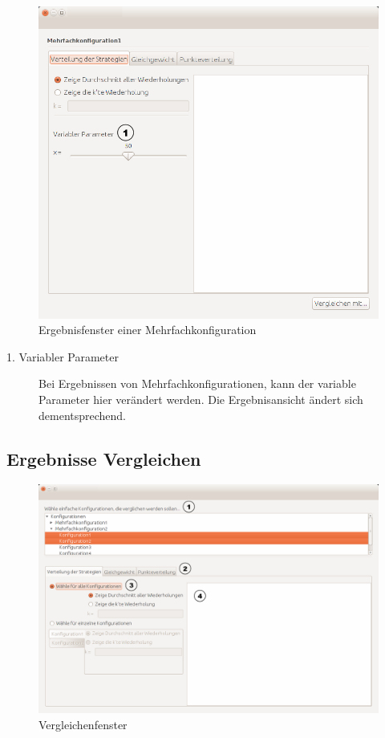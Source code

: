 \begin{figure}[H] 
  \centering
     \includegraphics[width=1.1\textwidth]{GUI_Entwurf/MehrfachErgebnisse.png}
  \caption{Ergebnisfenster einer Mehrfachkonfiguration}
  \label{fig:Bild7}
\end{figure}

\begin{description}

\item[1. Variabler Parameter] Bei Ergebnissen von Mehrfachkonfigurationen, kann der variable Parameter hier verändert werden. Die Ergebnisansicht ändert sich dementsprechend.


\end{description}

\pagebreak


\subsection{Ergebnisse Vergleichen}

\begin{figure}[H] 
  \centering
     \includegraphics[width=1.15\textwidth]{GUI_Entwurf/ErgebnisseVergleichen.png}
  \caption{Vergleichenfenster}
  \label{fig:Bild1}
\end{figure}

